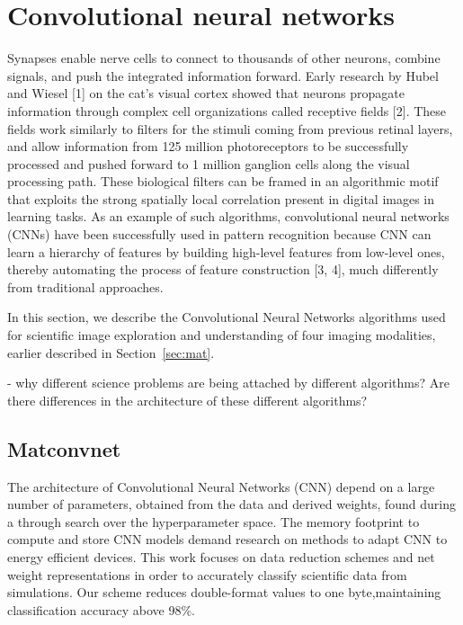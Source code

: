 \section{Convolutional neural networks}\label{sec:met}
Synapses enable nerve cells to connect to thousands of other neurons, combine signals, and push the integrated information forward. Early research by Hubel and Wiesel [1] on the cat’s visual cortex showed that neurons propagate information through complex cell organizations called receptive fields [2]. These fields work similarly to filters for the stimuli coming from previous retinal layers, and allow information from 125 million photoreceptors to be successfully processed and pushed forward to 1 million ganglion cells along the visual processing path. These biological filters can be framed in an algorithmic motif that exploits the strong spatially local correlation present in digital images in learning tasks. As an example of such algorithms, convolutional neural networks (CNNs) have been successfully used in pattern recognition because CNN can learn a hierarchy of features by building high-level features from low-level ones, thereby automating the process of feature construction [3, 4], much differently from traditional approaches.

In this section, we describe the Convolutional Neural Networks algorithms used for scientific image exploration and understanding of four imaging modalities, earlier described in Section~\ref{sec:mat}.

- why different science problems are being attached by different algorithms? Are there differences in the architecture of these different algorithms?


\subsection{Matconvnet}%
The architecture of Convolutional Neural Networks (CNN) depend on a
large number of parameters, obtained from the data and derived weights,
found during a through search over the hyperparameter space. The
memory footprint to compute and store CNN models demand research
on methods to adapt CNN to energy efficient devices. This work focuses
on data reduction schemes and net weight representations in order to
accurately classify scientific data from simulations. Our scheme reduces
double-format values to one byte,maintaining classification accuracy
above 98\%.

